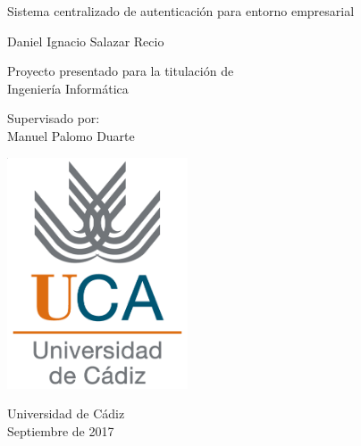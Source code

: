 \documentclass[12pt,a4paperpaper,]{report}
\date{}
\begin{document}
\begin{titlepage}
    \begin{center}

        
        \vspace*{2.5cm}
        
        \huge
        Sistema centralizado de autenticación para entorno empresarial
        
        \vspace{1.5cm}
        
        \Large
        Daniel Ignacio Salazar Recio

        \vspace{1.5cm}

        \normalsize
        Proyecto presentado para la titulación de \\
        Ingeniería Informática
        
        \vfill
        
        \normalsize
        Supervisado por:\\
        Manuel Palomo Duarte        

        \vspace{0.8cm}

        \includegraphics[width=0.4\textwidth]{style/logo_uca.png}
        
        \normalsize
        Universidad de Cádiz\\
        Septiembre de 2017


    \end{center}
\end{titlepage}
\end{document}
